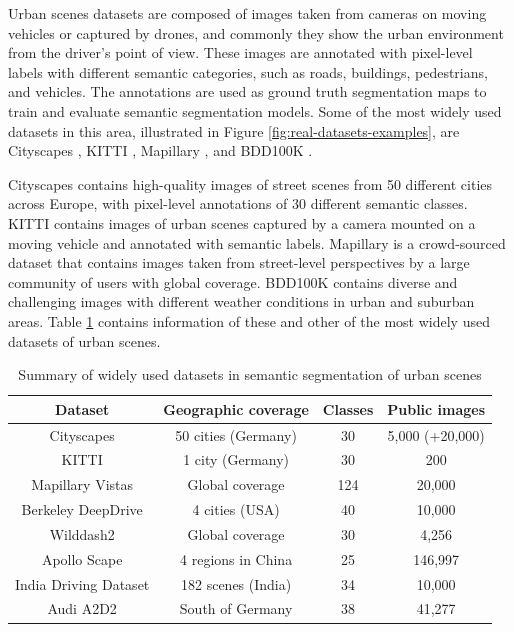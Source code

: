 Urban scenes datasets are composed of images taken from cameras on moving vehicles or captured by drones, and commonly they show the urban environment from the driver's point of view. These images are annotated with pixel-level labels with different semantic categories, such as roads, buildings, pedestrians, and vehicles. The annotations are used as ground truth segmentation maps to train and evaluate semantic segmentation models. Some of the most widely used datasets in this area, illustrated in Figure \ref{fig:real-datasets-examples}, are Cityscapes \cite{Cityscapes}, KITTI \cite{kitty}, Mapillary \cite{mapilliary}, and BDD100K \cite{BDD100K}.

Cityscapes \cite{Cityscapes} contains high-quality images of street scenes from 50 different cities across Europe, with pixel-level annotations of 30 different semantic classes. KITTI \cite{kitty} contains images of urban scenes captured by a camera mounted on a moving vehicle and annotated with semantic labels. Mapillary \cite{mapilliary} is a crowd-sourced dataset that contains images taken from street-level perspectives by a large community of users with global coverage. BDD100K \cite{BDD100K} contains diverse and challenging images with different weather conditions in urban and suburban areas. Table \ref{tab:real-datasets} contains information of these and other of the most widely used datasets of urban scenes.

\begin{table}
    \centering
    \begin{tabular}{|c|c|c|c|}
         \hline 
         Dataset & Geographic coverage & Classes & Public images \\
         \hline 
          Cityscapes \cite{Cityscapes} & 50 cities (Germany) & 30 & 
          5,000 (+20,000)  \\ 
          KITTI \cite{kitty}  & 1 city (Germany) & 30 & 200 \\
          Mapillary Vistas \cite{mapilliary}  & Global coverage & 124 & 20,000 \\
          Berkeley DeepDrive \cite{BDD100K}  & 4 cities (USA) & 40 & 10,000 \\
          Wilddash2 \cite{wildash2}  & Global coverage & 30 & 4,256 \\
          Apollo Scape \cite{wang2019apolloscape}  & 4 regions in China & 25  & 146,997 \\
          India Driving Dataset \cite{Varma_2019} & 182 scenes (India)  & 34 & 10,000 \\
          Audi A2D2 \cite{Geyer2020A2D2AA}  & South of Germany & 38 & 41,277 \\
           \hline
    \end{tabular}
    \caption[Summary of widely used real datasets]{Summary of widely used datasets in semantic segmentation of urban scenes}
    \label{tab:real-datasets}
\end{table}

